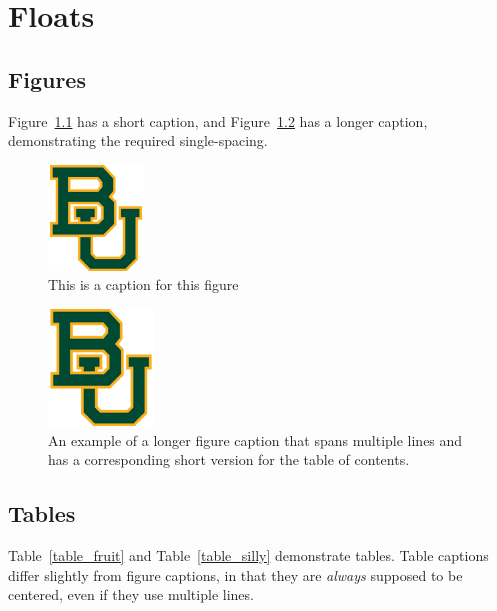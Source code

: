 \chapter{Floats}

\section{Figures}

Figure~\ref{figure_example1} has a short caption, and
Figure~\ref{figure_example2} has a longer caption, demonstrating the required
single-spacing.

\begin{figure}[ht]
\caption{This is a caption for this figure}
\label{figure_example1}
\centering
\includegraphics[width=1in]{baylor}
\end{figure}

\begin{figure}[ht]
\caption[The short table of contents version]{An example of a longer figure
caption that spans multiple lines and has a corresponding short version for the
table of contents.}
\label{figure_example2}
\centering
\includegraphics[width=0.25\textwidth]{baylor}
\end{figure}

\section{Tables}

Table~\ref{table_fruit} and Table~\ref{table_silly} demonstrate tables. Table
captions differ slightly from figure captions, in that they are \textit{always}
supposed to be centered, even if they use multiple lines.


